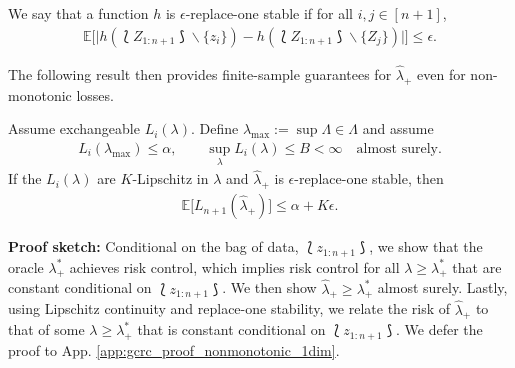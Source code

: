 \begin{definition}
    \label{eq:def_replace_one_stability}
    We say that a function  $h$ is $\epsilon$-replace-one stable if for all $i, j\in [n+1]$, 
    \begin{align*}
        \mathbb{E}\Big[\big|h(\lbag Z_{1:n+1}\rbag\backslash \{z_i\})-h(\lbag Z_{1:n+1}\rbag\backslash \{Z_j\})\big|\Big] \leq \epsilon.
    \end{align*}
\end{definition}
The following result then provides finite-sample guarantees for $\hat\lambda_+$ even for non-monotonic losses.
\begin{theorem}
\label{thm:gcrc_nonmonotonic}
    Assume exchangeable $L_i(\lambda)$. Define  $\lambda_{\max}:=\sup\Lambda\in \Lambda$ and assume 
    \begin{align*}
        L_i(\lambda_{\max})\leq \alpha, \qquad \sup_{\lambda}L_i(\lambda)\leq B < \infty \quad \text{almost surely}.
    \end{align*}
    If the $L_i(\lambda)$ are $K$-Lipschitz in $\lambda$ and $\hat\lambda_+$ is $\epsilon$-replace-one stable, then
    \begin{align*}
        \mathbb{E}\big[L_{n+1}(\hat\lambda_+)\big] \leq \alpha + K\epsilon.
    \end{align*}
\end{theorem}
\textbf{Proof sketch:} Conditional on the bag of data, $\lbag z_{1:n+1} \rbag$, we show that the oracle $\lambda_+^*$ achieves risk control, which implies risk control for all $\lambda\geq\lambda_+^*$ that are constant conditional on $\lbag z_{1:n+1} \rbag$. We then show $\hat\lambda_+\geq \lambda_+^*$ almost surely. Lastly, using Lipschitz continuity and replace-one stability, we relate the risk of $\hat\lambda_+$ to that of some $\lambda\geq\lambda_+^*$ that is constant conditional on $\lbag z_{1:n+1} \rbag$. We defer the proof to App. \ref{app:gcrc_proof_nonmonotonic_1dim}.

